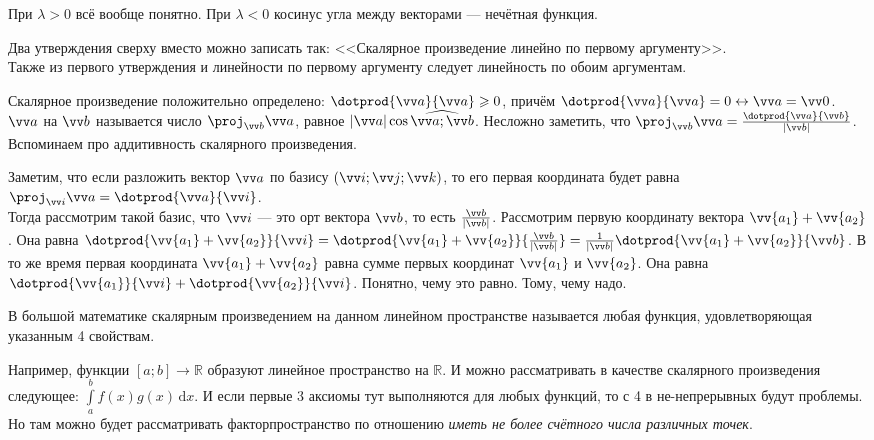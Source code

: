 \documentclass{article}
\let\vec\vv
\begin{document}
\begin{itemize}
\begin{Proof}
            При $\lambda>0$ всё вообще понятно. При $\lambda<0$ косинус угла между векторами --- нечётная функция.
        \end{Proof}
        \begin{Comment}
            Два утверждения сверху вместо можно записать так: <<Скалярное произведение линейно по первому аргументу>>.\\
            Также из первого утверждения и линейности по первому аргументу следует линейность по обоим аргументам.
        \end{Comment}
        \thm Скалярное произведение положительно определено: $\dotprod{\vec a}{\vec a}\geqslant0$, причём $\dotprod{\vec a}{\vec a}=0\leftrightarrow\vec a=\vec0$.
        \dfn {} $\vec a$ на $\vec b$ называется число $\proj_{\vec b}\vec a$, равное $|\vec a|\cos\widehat{\vec a;\vec b}$.
        \thm Несложно заметить, что $\proj_{\vec b}\vec a=\frac{\dotprod{\vec a}{\vec b}}{|\vec b|}$.
        \thm Вспоминаем про аддитивность скалярного произведения.
        \begin{Proof}
            Заметим, что если разложить вектор $\vec a$ по базису $(\vec i;\vec j;\vec k)$, то его первая координата будет равна $\proj_{\vec i}\vec a=\dotprod{\vec a}{\vec i}$.\\ Тогда рассмотрим такой базис, что $\vec i$ --- это орт вектора $\vec b$, то есть $\frac{\vec b}{|\vec b|}$. Рассмотрим первую координату вектора $\vec{a_1}+\vec{a_2}$. Она равна $\dotprod{\vec{a_1}+\vec{a_2}}{\vec i}=\dotprod{\vec{a_1}+\vec{a_2}}{\frac{\vec b}{|\vec b|}}=\frac1{|\vec b|}\dotprod{\vec{a_1}+\vec{a_2}}{\vec b}$. В то же время первая координата $\vec{a_1}+\vec{a_2}$ равна сумме первых координат $\vec{a_1}$ и $\vec{a_2}$. Она равна $\dotprod{\vec{a_1}}{\vec i}+\dotprod{\vec{a_2}}{\vec i}$. Понятно, чему это равно. Тому, чему надо.
        \end{Proof}
        \begin{Comment}
            В большой математике скалярным произведением на данном линейном пространстве называется любая функция, удовлетворяющая указанным 4 свойствам.
            \begin{Example}
                Например, функции $[a;b]\to\mathbb R$ образуют линейное пространство на $\mathbb R$. И можно рассматривать в качестве скалярного произведения следующее: $\int\limits_a^bf(x)g(x)\,\mathrm dx$. И если первые 3 аксиомы тут выполняются для любых функций, то с 4 в не-непрерывных будут проблемы. Но там можно будет рассматривать факторпространство по отношению \textit{иметь не более счётного числа различных точек}.

\end{Example}
\end{Comment}
\end{itemize}
\end{document}
